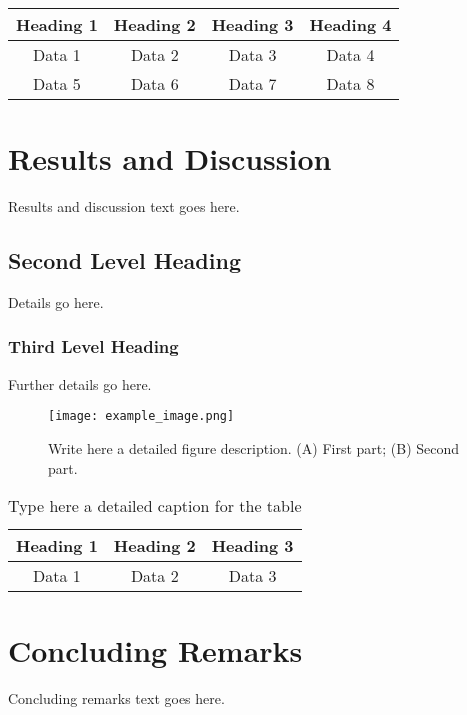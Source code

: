 \documentclass[a4paper, 11pt]{article}
\begin{document}
	\begin{landscape}
		\begin{longtable}{|c|c|c|c|}
			\hline
			Heading 1 & Heading 2 & Heading 3 & Heading 4 \\
			\hline
			Data 1 & Data 2 & Data 3 & Data 4 \\
			\hline
			Data 5 & Data 6 & Data 7 & Data 8 \\
			\hline
		\end{longtable}
	\end{landscape}
	
	\section{Results and Discussion}
	Results and discussion text goes here.
	
	\subsection{Second Level Heading}
	Details go here.
	
	\subsubsection{Third Level Heading}
	Further details go here.
	
	\begin{figure}[H]
		\centering
		\texttt{[image: example\_image.png]}
		\caption{Write here a detailed figure description. (A) First part; (B) Second part.}
		\label{fig:example}
	\end{figure}
	
	\begin{table}[H]
		\centering
		\caption{Type here a detailed caption for the table}
		\begin{tabular}{|c|c|c|}
			\hline
			Heading 1 & Heading 2 & Heading 3 \\
			\hline
			Data 1 & Data 2 & Data 3 \\
			\hline
		\end{tabular}
		\label{tab:example}
	\end{table}
	
	\section{Concluding Remarks}
	Concluding remarks text goes here.
	
\end{document}
